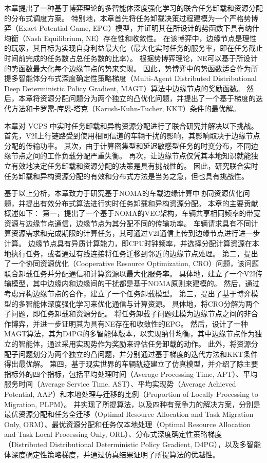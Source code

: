 本章提出了一种基于博弈理论的多智能体深度强化学习的联合任务卸载和资源分配的分布式调度方案。
特别地，本章首先将任务卸载决策过程建模为一个严格势博弈（Exact Potential Game, EPG）\cite{chew2016potential}模型，并证明其在所设计的势函数下具有纳什均衡（Nash Equilibrium, NE）存在性和收敛性。
在该博弈中，边缘节点是理性的玩家，其目标为实现自身利益最大化（最大化实时任务的服务率，即在任务截止时间前完成的任务数占总任务数的比率）。
根据势博弈理论，NE可以基于所设计的势函数最大化每个边缘节点的势来实现。
因此，势博弈中的势函数适合作为所提多智能体分布式深度确定性策略梯度（Multi-Agent Distributed Distributional Deep Deterministic Policy Gradient, MAGT）算法中边缘节点的奖励函数。
然后，本章将资源分配问题分为两个独立的凸优化问题，并提出了一个基于梯度的迭代方法和卡罗需-库恩-塔克（Karush-Kuhn-Tucher, KKT）条件的最优解。

本章对 VCPS 中实时任务卸载和异构资源分配进行了联合研究并解决以下挑战。
首先，V2I上行链路受到使用相同信道的车辆干扰的影响，其影响取决于边缘节点分配的传输功率。
其次，由于计算密集型和延迟敏感型任务的时变分布，不同边缘节点之间的工作负载分配严重失衡。
再次，让边缘节点仅凭其本地知识就能独立有效地决定任务卸载和资源分配的决策是具有挑战性的。
因此，研究联合实时任务卸载和异构资源分配的有效和分布式方法是当务之急，但也具有挑战性。

基于以上分析，本章致力于研究基于NOMA的车载边缘计算中协同资源优化问题，并提出有效分布式算法进行实时任务卸载和异构资源分配。
本章的主要贡献概述如下：
第一，提出了一个基于NOMA的VEC架构，车辆共享相同频率的带宽资源与边缘节点通信，边缘节点为其分配不同的传输功率。
车辆请求具有不同计算资源需求和完成期限的计算任务，其可通过V2I通信上传到边缘节点进行进一步计算。
边缘节点具有异质计算能力，即CPU时钟频率，并选择分配计算资源在本地执行任务，或者通过有线连接将任务迁移到邻近的边缘节点处理。
第二，提出了一个协同资源优化（Cooperative Resource Optimization, CRO）问题，该问题联合卸载任务并分配通信和计算资源以最大化服务率。
具体地，建立了一个V2I传输模型，其中边缘内和边缘间的干扰都是基于NOMA原则来建模的。
然后，通过考虑异构边缘节点的合作，建立了一个任务卸载模型。
第三，提出了基于博弈模型的多智能体深度强化学习来优化通信与计算资源。
具体地，将CRO分解为两个子问题，即任务卸载和资源分配。
将任务卸载子问题建模为边缘节点之间的非合作博弈，并进一步证明其为具有NE存在和收敛性的EPG。
然后，设计了一种MAGT算法，其为D4PG\cite{barth2018distributed}的多智能体版本，以实现纳什均衡，其中边缘节点作为独立的智能体，通过采用实现势作为奖励来评估任务卸载的动作。
此外，将资源分配子问题划分为两个独立的凸问题，并分别通过基于梯度的迭代方法和KKT条件得出最优解。
第四，基于现实世界的车辆轨迹建立了仿真模型，并介绍了除主要指标外的四个指标，包括平均处理时间（Average Processing Time, APT）、平均服务时间（Average Service Time, AST）、平均实现势（Average Achieved Potential, AAP）和本地处理与迁移的比例（Proportion of Locally Processing to Migration, PLPM）。
并实现了所提算法，以及四种有竞争力的解决方案，分别是最优资源分配和任务全迁移（Optimal Resource Allocation and Task Migration Only, ORM）、最优资源分配和任务仅本地处理（Optimal Resource Allocation and Task Local Processing Only, ORL）、分布式深度确定性策略梯度（Distributed Distributional Deterministic Policy Gradient, D4PG）\cite{barth2018distributed}，以及多智能体深度确定性策略梯度\cite{zhang2021adaptive}，并通过仿真结果证明了所提算法的优越性。

